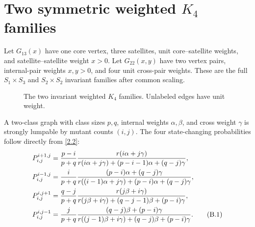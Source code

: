 \section{Two symmetric weighted \texorpdfstring{$K_4$}{K4} families}\label{app:k4}

Let $G_{13}(x)$ have one core vertex, three satellites, unit
core--satellite weights, and satellite--satellite weight $x>0$.  Let
$G_{22}(x,y)$ have two vertex pairs, internal-pair weights $x,y>0$, and four
unit cross-pair weights.  These are the full $S_1\times S_3$ and
$S_2\times S_2$ invariant families after common scaling.

\begin{figure}[H]
\centering
{}
\caption{The two invariant weighted $K_4$ families.  Unlabeled edges have
unit weight.}
\label{fig:k4}
\end{figure}

A two-class graph with class sizes $p,q$, internal weights $\alpha,\beta$,
and cross weight $\gamma$ is strongly lumpable by mutant counts $(i,j)$.
The four state-changing probabilities follow directly from \eqref{2.2}:
\begin{align}
 P_{i,j}^{i+1,j}
 &=\frac{p-i}{p+q}\frac{r(i\alpha+j\gamma)}
 {r(i\alpha+j\gamma)+(p-i-1)\alpha+(q-j)\gamma},\notag\\
 P_{i,j}^{i-1,j}
 &=\frac{i}{p+q}\frac{(p-i)\alpha+(q-j)\gamma}
 {r((i-1)\alpha+j\gamma)+(p-i)\alpha+(q-j)\gamma},\notag\\
 P_{i,j}^{i,j+1}
 &=\frac{q-j}{p+q}\frac{r(j\beta+i\gamma)}
 {r(j\beta+i\gamma)+(q-j-1)\beta+(p-i)\gamma},\notag\\
 P_{i,j}^{i,j-1}
 &=\frac{j}{p+q}\frac{(q-j)\beta+(p-i)\gamma}
 {r((j-1)\beta+i\gamma)+(q-j)\beta+(p-i)\gamma}.
                                                               \tag{B.1}\label{B.1}
\end{align}

